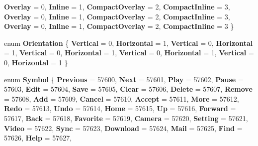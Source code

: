 \begin{DoxyCompactItemize}
{\bfseries Overlay} = 0, 
{\bfseries Inline} = 1, 
{\bfseries Compact\+Overlay} = 2, 
{\bfseries Compact\+Inline} = 3, 
\newline
{\bfseries Overlay} = 0, 
{\bfseries Inline} = 1, 
{\bfseries Compact\+Overlay} = 2, 
{\bfseries Compact\+Inline} = 3, 
\newline
{\bfseries Overlay} = 0, 
{\bfseries Inline} = 1, 
{\bfseries Compact\+Overlay} = 2, 
{\bfseries Compact\+Inline} = 3
 \}
\item 
\mbox{\label{namespace_windows_1_1_u_i_1_1_xaml_1_1_controls_a55286136757833c08ae3e37673161c2c}} 
enum {\bfseries Orientation} \{ \newline
{\bfseries Vertical} = 0, 
{\bfseries Horizontal} = 1, 
{\bfseries Vertical} = 0, 
{\bfseries Horizontal} = 1, 
\newline
{\bfseries Vertical} = 0, 
{\bfseries Horizontal} = 1, 
{\bfseries Vertical} = 0, 
{\bfseries Horizontal} = 1, 
\newline
{\bfseries Vertical} = 0, 
{\bfseries Horizontal} = 1
 \}
\item 
\mbox{\label{namespace_windows_1_1_u_i_1_1_xaml_1_1_controls_ab2786e53a8f4a8379dca4f44df7d4497}} 
enum {\bfseries Symbol} \{ \newline
{\bfseries Previous} = 57600, 
{\bfseries Next} = 57601, 
{\bfseries Play} = 57602, 
{\bfseries Pause} = 57603, 
\newline
{\bfseries Edit} = 57604, 
{\bfseries Save} = 57605, 
{\bfseries Clear} = 57606, 
{\bfseries Delete} = 57607, 
\newline
{\bfseries Remove} = 57608, 
{\bfseries Add} = 57609, 
{\bfseries Cancel} = 57610, 
{\bfseries Accept} = 57611, 
\newline
{\bfseries More} = 57612, 
{\bfseries Redo} = 57613, 
{\bfseries Undo} = 57614, 
{\bfseries Home} = 57615, 
\newline
{\bfseries Up} = 57616, 
{\bfseries Forward} = 57617, 
{\bfseries Back} = 57618, 
{\bfseries Favorite} = 57619, 
\newline
{\bfseries Camera} = 57620, 
{\bfseries Setting} = 57621, 
{\bfseries Video} = 57622, 
{\bfseries Sync} = 57623, 
\newline
{\bfseries Download} = 57624, 
{\bfseries Mail} = 57625, 
{\bfseries Find} = 57626, 
{\bfseries Help} = 57627, 
\newline

\end{DoxyCompactItemize}
